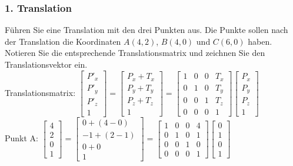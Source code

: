 \documentclass[11pt, a4paper]{article} %
\begin{document}
\subsubsection*{1. Translation}
Führen Sie eine Translation mit den drei Punkten aus. Die Punkte sollen nach der Translation die Koordinaten $A(4,2)$, $B(4,0)$ und $C(6,0)$ haben. Notieren Sie die entsprechende Translationsmatrix und zeichnen Sie den Translationsvektor ein. \\[0.1cm]
Translationsmatrix: $\begin{bmatrix}
	P'_x \\ P'_y \\ P'_z \\ 1
\end{bmatrix} = \begin{bmatrix}
P_x + T_x \\ P_y + T_y \\ P_z + T_z \\ 1
\end{bmatrix} = \begin{bmatrix}
1 & 0 & 0 & T_x \\ 0 & 1 & 0 & T_y \\ 0 & 0 & 1 & T_z \\ 0 & 0 & 0 & 1
\end{bmatrix} \begin{bmatrix}
P_x \\ P_y \\ P_z \\ 1
\end{bmatrix}$ \\
Punkt A: $\begin{bmatrix}
	4 \\ 2 \\ 0 \\ 1
\end{bmatrix} = \begin{bmatrix}
	0+(4-0) \\ -1+(2-1) \\ 0+0 \\ 1
\end{bmatrix} = \begin{bmatrix}
	1 & 0 & 0 & 4 \\ 0 & 1 & 0 & 1 \\ 0 & 0 & 1 & 0 \\ 0 & 0 & 0 & 1
\end{bmatrix} \begin{bmatrix}
	0 \\ 1 \\ 0 \\ 1
\end{bmatrix}$ \\
\end{document}
